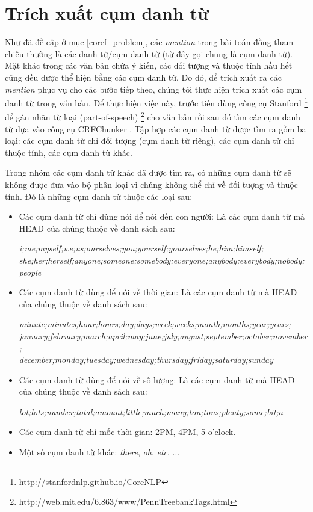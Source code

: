 \documentclass[12pt]{report}
\begin{document}
		\section{Trích xuất cụm danh từ}
			\par Như đã đề cập ở mục \ref{coref_problem}, các \textit{mention} trong bài toán đồng tham chiếu thường là các danh từ/cụm danh từ (từ đây gọi chung là cụm danh từ). Mặt khác trong các văn bản chứa ý kiến, các đối tượng và thuộc tính hầu hết cũng đều được thể hiện bằng các cụm danh từ. Do đó, để trích xuất ra các \textit{mention} phục vụ cho các bước tiếp theo, chúng tôi thực hiện trích xuất các cụm danh từ trong văn bản. Để thực hiện việc này, trước tiên dùng công cụ Stanford \footnote{http://stanfordnlp.github.io/CoreNLP} để gán nhãn từ loại (part-of-speech) \footnote{http://web.mit.edu/6.863/www/PennTreebankTags.html} cho văn bản rồi sau đó tìm các cụm danh từ dựa vào công cụ CRFChunker \cite{crfchunker}. Tập hợp các cụm danh từ được tìm ra gồm ba loại: các cụm danh từ chỉ đối tượng (cụm danh từ riêng), các cụm danh từ chỉ thuộc tính, các cụm danh từ khác.
			\par Trong nhóm các cụm danh từ khác đã được tìm ra, có những cụm danh từ sẽ không được đưa vào bộ phân loại vì chúng không thể chỉ về đối tượng và thuộc tính. Đó là những cụm danh từ thuộc các loại sau:
				\begin{itemize}
					\item{Các cụm danh từ chỉ dùng nói để nói đến con người: Là các cụm danh từ mà HEAD của chúng thuộc về danh sách sau:
					\par \textit{i;me;myself;we;us;ourselves;you;yourself;yourselves;he;him;himself;
					\\she;her;herself;anyone;someone;somebody;everyone;anybody;everybody;nobody;people}}
					\item{Các cụm danh từ dùng để nói về thời gian: Là các cụm danh từ mà HEAD của chúng thuộc về danh sách sau:
					\par \textit{minute;minutes;hour;hours;day;days;week;weeks;month;months;year;years;
					\\january;february;march;april;may;june;july;august;september;october;november;
					\\december;monday;tuesday;wednesday;thursday;friday;saturday;sunday}}
					\item{Các cụm danh từ dùng để nói về số lượng: Là các cụm danh từ mà HEAD của chúng thuộc về danh sách sau:
					\par \textit{lot;lots;number;total;amount;little;much;many;ton;tons;plenty;some;bit;a}}
					\item{Các cụm danh từ chỉ mốc thời gian: 2PM, 4PM, 5 o'clock.}
					\item{Một số cụm danh từ khác: \textit{there}, \textit{oh}, \textit{etc}, ...}					
				\end{itemize}
\end{document}
